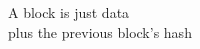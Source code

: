 \documentclass[preview]{standalone}
\begin{document}
\begin{center}
A block is just data\\plus the previous block's hash
\end{center}
\end{document}
